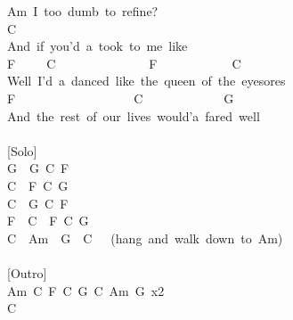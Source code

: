 \documentclass[]{book}
\begin{document}
Am~I~too~dumb~to~refine?\\
\hspace*{0.333em}\hspace*{0.333em}\hspace*{0.333em}\hspace*{0.333em}\hspace*{0.333em}\hspace*{0.333em}\hspace*{0.333em}\hspace*{0.333em}\hspace*{0.333em}\hspace*{0.333em}\hspace*{0.333em}\hspace*{0.333em}\hspace*{0.333em}\hspace*{0.333em}\hspace*{0.333em}\hspace*{0.333em}\hspace*{0.333em}\hspace*{0.333em}\hspace*{0.333em}\hspace*{0.333em}\hspace*{0.333em}\hspace*{0.333em}\hspace*{0.333em}C\\
And~if~you'd~a~took~to~me~like\\
\hspace*{0.333em}\hspace*{0.333em}\hspace*{0.333em}\hspace*{0.333em}\hspace*{0.333em}F~~~~~C~~~~~~~~~~~~~~~F~~~~~~~~~~~~C\\
Well~I'd~a~danced~like~the~queen~of~the~eyesores\\
F~~~~~~~~~~~~~~~~~~~C~~~~~~~~~~~~~G\\
And~the~rest~of~our~lives~would'a~fared~well\\
~\\
{[}Solo{]}\\
G~~G~C~F\\
C~~F~C~G\\
C~~G~C~F\\
F~~C~~F~C~G\\
C~~Am~~G~~C~~~(hang~and~walk~down~to~Am)\\
~\\
{[}Outro{]}\\
Am~C~F~C~G~C~Am~G~x2\\
C\\
\end{document}
